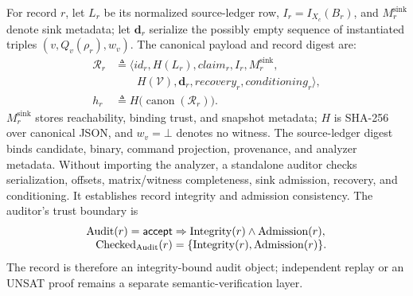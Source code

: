 For record $r$, let $L_r$ be its normalized source-ledger row,
$I_r=I_{X_c}(B_r)$, and $M_r^{\mathrm{sink}}$ denote sink metadata; let
$\mathbf d_r$ serialize the possibly empty sequence of instantiated triples
$(v,Q_v(\rho_r),w_v)$. The canonical payload and record digest are:
\begin{equation}
\begin{aligned}
\mathcal R_r&\triangleq\bigl\langle
 \mathit{id}_r,H(L_r),\mathit{claim}_r,I_r,M_r^{\mathrm{sink}},\\[-1mm]
 &\qquad H(\mathcal{V}),\mathbf d_r,\mathit{recovery}_r,
   \mathit{conditioning}_r
\bigr\rangle,\\
h_r&\triangleq H\bigl(\operatorname{canon}(\mathcal R_r)\bigr).
\end{aligned}
\label{eq:evidence-record}
\end{equation}
$M_r^{\mathrm{sink}}$ stores reachability, binding trust, and snapshot metadata;
$H$ is SHA-256 over canonical JSON, and $w_v=\bot$ denotes no witness. The
source-ledger digest binds candidate, binary, command projection, provenance,
and analyzer metadata. Without importing the analyzer, a standalone auditor
checks serialization, offsets, matrix/witness completeness, sink admission,
recovery, and conditioning. It establishes record integrity and admission
consistency. The auditor's trust boundary is
\begin{equation}
\begin{aligned}
\operatorname{Audit}(r)=\mathsf{accept}
 &\Rightarrow \operatorname{Integrity}(r)\land\operatorname{Admission}(r),\\[-1mm]
\operatorname{Checked}_{\rm Audit}(r)
 &=\{\operatorname{Integrity}(r),\operatorname{Admission}(r)\}.
\end{aligned}
\label{eq:auditor-boundary}
\end{equation}
The record is therefore an integrity-bound audit object; independent replay or
an UNSAT proof remains a separate semantic-verification layer.

